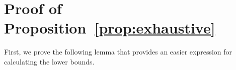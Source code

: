 \documentclass[a4paper]{article}
\theoremstyle{definition}
\theoremstyle{plain}
\newtheorem{proposition}{Proposition}
\begin{document}











\newpage

\appendix

\section{Proof of Proposition~\ref{prop:exhaustive}}\label{app:proof}

First, we prove the following lemma that provides an easier expression for
calculating the lower bounds.
\end{document}
